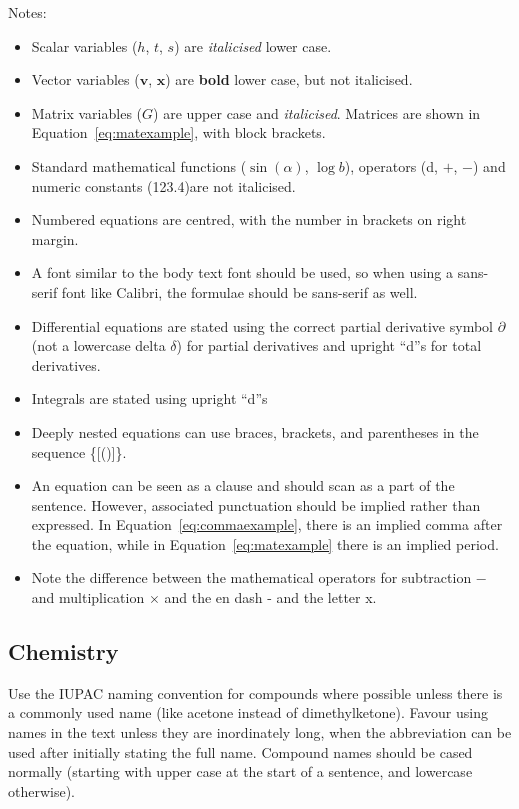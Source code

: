 \documentclass[a5paper, 10pt]{article}
\begin{document}
Notes:
\begin{itemize}
\item Scalar variables ($h$, $t$, $s$) are \emph{italicised} lower case.
\item Vector variables ($\mathbf{v}$, $\mathbf{x}$) are \textbf{bold}
  lower case, but not italicised.
\item Matrix variables ($G$) are upper case and \emph{italicised}.
  Matrices are shown in Equation~\ref{eq:matexample}, with block
  brackets.
\item Standard mathematical functions ($\sin(\alpha)$, $\log b$), operators (d,
  $+$, $-$) and
  numeric constants (\num{123.4})are not italicised.
\item Numbered equations are centred, with the number in brackets on
  right margin.
\item A font similar to the body text font should be used, so when
  using a sans-serif font like Calibri, the formulae should be
  sans-serif as well.
\item Differential equations are stated using the correct partial
  derivative symbol $\partial$ (not a lowercase delta $\delta$) for
  partial derivatives and upright ``d''s  for total derivatives.
\item Integrals are stated using upright ``d''s
\item Deeply nested equations can use braces, brackets, and parentheses in the
  sequence \{[()]\}.
\item An equation can be seen as a clause and should scan as a part of
  the sentence.  However, associated punctuation should be implied
  rather than expressed.  In Equation~\ref{eq:commaexample}, there is
  an implied comma after the equation, while in
  Equation~\ref{eq:matexample} there is an implied period.
\item Note the difference between the mathematical operators for subtraction $-$ and multiplication $\times$ and the en dash - and the letter x. 
\end{itemize}

\subsection{Chemistry}
Use the IUPAC naming convention for compounds where possible unless
there is a commonly used name (like acetone instead of
dimethylketone).  Favour using names in the text unless they are
inordinately long, when the abbreviation can be used after initially
stating the full name.  Compound names should be cased normally
(starting with upper case at the start of a sentence, and lowercase
otherwise).
\end{document}
